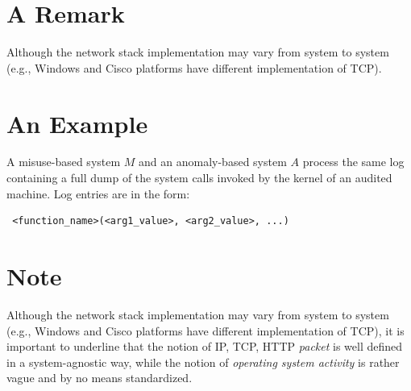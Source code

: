 
\section{A Remark}

\begin{rem}
Although the network stack implementation may vary from system to system (e.g., \textsf{Windows} and \textsf{Cisco} platforms have different implementation of \ac{TCP}).
\end{rem}


\section{An Example}

\begin{example}\label{ex:misuse-vs-anomaly}
A misuse-based system $M$ and an anomaly-based system $A$ process the same log containing a full dump of the system calls invoked by the kernel of an audited machine. Log entries are in the form:

\begin{center}\small
\begin{verbatim} <function_name>(<arg1_value>, <arg2_value>, ...)
\end{verbatim}
\end{center}
\end{example}


\section{Note}

\begin{note}\label{note:network-stack-standardized}
Although the network stack implementation may vary from system to system (e.g., \textsf{Windows} and \textsf{Cisco} platforms have different implementation of \ac{TCP}), it is important to underline that the notion of IP, TCP, HTTP \emph{packet} is well defined in a system-agnostic way, while the notion of \emph{operating system activity} is rather vague and by no means standardized.
\end{note}
